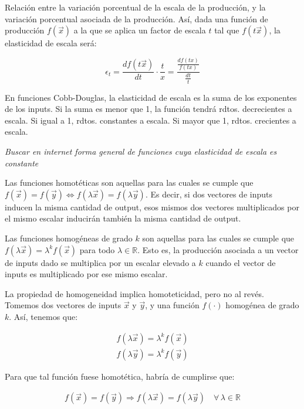 \documentclass{nuevotema}
\begin{document}
\conceptos


Relación entre la variación porcentual de la escala de la producción, y la variación porcentual asociada de la producción. Así, dada una función de producción $f(\vec{x})$ a la que se aplica un factor de escala $t$ tal que $f(t\vec{x})$, la elasticidad de escala será:

\begin{equation}
\epsilon_{t} = \frac{df(t\vec{x})}{dt} \cdot \frac{t}{x} = \frac{\frac{df(tx)}{f(tx)}}{ \frac{dt}{t}}
\end{equation}

En funciones Cobb-Douglas, la elasticidad de escala es la suma de los exponentes de los inputs. Si la suma es menor que 1, la función tendrá rdtos. decrecientes a escala. Si igual a 1, rdtos. constantes a escala. Si mayor que 1, rdtos. crecientes a escala.

\textit{Buscar en internet forma general de funciones cuya elasticidad de escala es constante}


Las funciones homotéticas son aquellas para las cuales se cumple que $f(\vec{x}) = f(\vec{y}) \iff f(\lambda \vec{x}) = f(\lambda \vec{y})$. Es decir, si dos vectores de inputs inducen la misma cantidad de output, esos mismos dos vectores multiplicados por el mismo escalar inducirán también la misma cantidad de output. 

Las funciones homogéneas de grado $k$ son aquellas para las cuales se cumple que $f(\lambda \vec{x}) = \lambda^k f(\vec{x})$ para todo $\lambda \in \mathbb{R}$. Esto es, la producción asociada a un vector de inputs dado se multiplica por un escalar elevado a $k$ cuando el vector de inputs es multiplicado por ese mismo escalar.

La propiedad de homogeneidad implica homoteticidad, pero no al revés. Tomemos dos vectores de inputs $\vec{x}$ y $\vec{y}$, y una función $f(\cdot)$ homogénea de grado $k$. Así, tenemos que:

\begin{align}
	f(\lambda \vec{x}) = \lambda^k f(\vec{x}) \\
	f(\lambda \vec{y}) = \lambda^k f(\vec{y})
\end{align}

Para que tal función fuese homotética, habría de cumplirse que:

\begin{align}
	f(\vec{x}) = f(\vec{y}) \Rightarrow f(\lambda \vec{x}) = f(\lambda \vec{y}) \quad \forall \, \lambda \in \mathbb{R}
\end{align}
\end{document}
